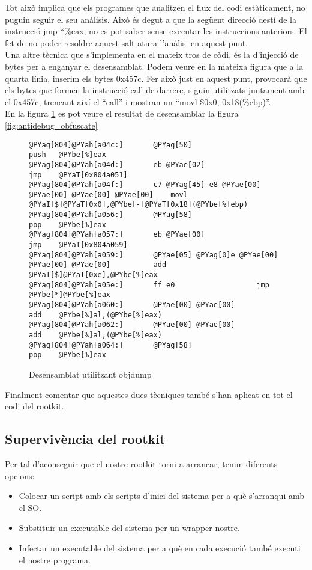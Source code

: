 Tot això implica que els programes que analitzen
el flux del codi estàticament, no puguin seguir el seu anàlisis. Això és degut a que la següent direcció destí
de la instrucció jmp *\%eax, no es pot saber sense executar les instruccions anteriors. El fet de no poder resoldre aquest
salt atura l'anàlisi en aquest punt. \\

Una altre tècnica que s'implementa en el mateix tros de còdi, és la d'injecció de bytes per a enganyar el
desensamblat. Podem veure en la mateixa figura que a la quarta línia, inserim els bytes 0x457c. Fer això
just en aquest punt, provocarà que els bytes que formen la instrucció call de darrere, siguin utilitzats
juntament amb el 0x457c, trencant així el ``call'' i mostran un ``movl \$0x0,-0x18(\%ebp)''. \\

En la figura \ref{fig:antidebug_obfuscate2} es pot veure el resultat de desensamblar la figura \ref{fig:antidebug_obfuscate}

\begin{figure}[h!]
\begin{Verbatim}[commandchars=@\[\]]
@PYag[804]@PYah[a04c:]       @PYag[50]                      push   @PYbe[%]eax
@PYag[804]@PYah[a04d:]       eb @PYae[02]                   jmp    @PYaT[0x804a051]
@PYag[804]@PYah[a04f:]       c7 @PYag[45] e8 @PYae[00] @PYae[00] @PYae[00] @PYae[00]    movl   @PYaI[$]@PYaT[0x0],@PYbe[-]@PYaT[0x18](@PYbe[%]ebp)
@PYag[804]@PYah[a056:]       @PYag[58]                      pop    @PYbe[%]eax
@PYag[804]@PYah[a057:]       eb @PYae[00]                   jmp    @PYaT[0x804a059]
@PYag[804]@PYah[a059:]       @PYae[05] @PYag[0]e @PYae[00] @PYae[00] @PYae[00]          add    @PYaI[$]@PYaT[0xe],@PYbe[%]eax
@PYag[804]@PYah[a05e:]       ff e0                   jmp    @PYbe[*]@PYbe[%]eax
@PYag[804]@PYah[a060:]       @PYae[00] @PYae[00]                   add    @PYbe[%]al,(@PYbe[%]eax)
@PYag[804]@PYah[a062:]       @PYae[00] @PYae[00]                   add    @PYbe[%]al,(@PYbe[%]eax)
@PYag[804]@PYah[a064:]       @PYag[58]                      pop    @PYbe[%]eax
\end{Verbatim}
	\caption{Desensamblat utilitzant objdump}
	\label{fig:antidebug_obfuscate2}
\end{figure}

Finalment comentar que aquestes dues tècniques també s'han aplicat en tot el codi del rootkit.

\subsection{Supervivència del rootkit}
Per tal d'aconseguir que el nostre rootkit torni a arrancar, tenim diferents opcions:
\begin{itemize}
\item Colocar un script amb els scripts d'inici del sistema per a què s'arranqui amb el SO.
\item Substituir un executable del sistema per un wrapper nostre.
\item Infectar un executable del sistema per a què en cada execució també executi el nostre programa.
\end{itemize}

